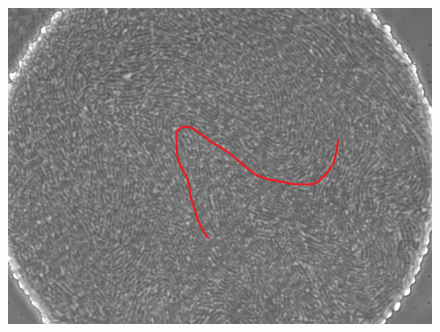 \documentclass[a4paper,11pt]{jsarticle}
\begin{document}
\begin{figure}[htbp]
  \centering
  \includegraphics[width=\columnwidth]{Series015_t180000_RAW_ch00.png}
  \caption{}
  \label{fig:}
\end{figure}
\end{document}
